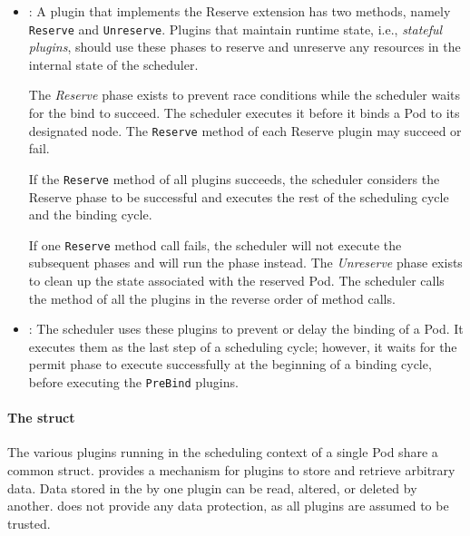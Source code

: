 \begin{itemize}
      \item
            \textbf{}: A plugin that implements the Reserve
            extension has two methods, namely \texttt{Reserve} and
            \texttt{Unreserve}. Plugins that maintain runtime state, i.e.,
            \textit{stateful plugins}, should use these phases to reserve and
            unreserve any resources in the internal state of the scheduler.

            The \emph{Reserve} phase exists to prevent race conditions while the
            scheduler waits for the bind to succeed. The scheduler executes it
            before it binds a Pod to its designated node. The \texttt{Reserve}
            method of each Reserve plugin may succeed or fail.

            If the \texttt{Reserve} method of all plugins succeeds, the
            scheduler considers the Reserve phase to be successful and executes
            the rest of the scheduling cycle and the binding cycle.

            If one \texttt{Reserve} method call fails, the scheduler will not
            execute the subsequent phases and will run the  phase
            instead. The \emph{Unreserve} phase exists to clean up the state
            associated with the reserved Pod. The scheduler calls the
             method of all the  plugins in the reverse
            order of  method calls.
      \item
            \textbf{}: The scheduler uses these plugins to prevent or
            delay the binding of a Pod. It executes them as the last step of a
            scheduling cycle; however, it waits for the permit phase to execute
            successfully at the beginning of a binding cycle, before executing
            the \texttt{PreBind} plugins.
\end{itemize}


\paragraph*{The  struct}
\label{section:cycle-state}

The various plugins running in the scheduling context of a single Pod share a
common  struct.  provides a mechanism for plugins
to store and retrieve arbitrary data. Data stored in the  by one
plugin can be read, altered, or deleted by another.  does not
provide any data protection, as all plugins are assumed to be trusted.


